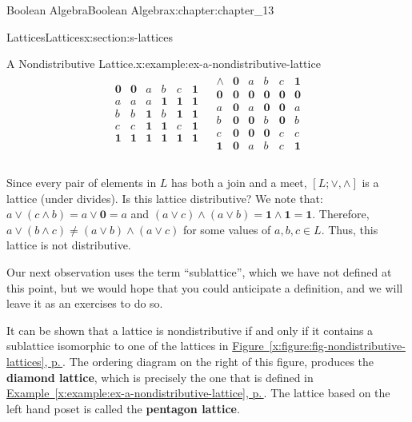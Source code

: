 \documentclass[twoside,10pt,]{book}
\newcommand{\xreffont}{\relax}
\newcommand{\terminology}[1]{\textbf{#1}}
\numberwithin{equation}{section}
\begin{document}
\begin{chapterptx}{Boolean Algebra}{}{Boolean Algebra}{}{}{x:chapter:chapter_13}
\begin{sectionptx}{Lattices}{}{Lattices}{}{}{x:section:s-lattices}
\begin{example}{A Nondistributive Lattice.}{x:example:ex-a-nondistributive-lattice}
\begin{equation*}
\begin{array}{cc}
\begin{array}{c|ccccc}
\hline
\pmb{0} &	 \pmb{0} & a & b & c & \pmb{1} \\
a & 	 a & a & \pmb{1} & \pmb{1} & \pmb{1} \\
b &	 b & \pmb{1} & b & \pmb{1} & \pmb{1} \\
c &	 c & \pmb{1} & \pmb{1} & c & \pmb{1} \\
\pmb{1} &	 \pmb{1} & \pmb{1} & \pmb{1} & \pmb{1} & \pmb{1} \\
\end{array}
&
\begin{array}{c|ccccc}
\land  & 	 \pmb{0} &  a  & b  &  c &  \pmb{1} \\
\hline
\pmb{0} &	 \pmb{0} & \pmb{0} & \pmb{0} & \pmb{0} & \pmb{0} \\
a & 	  \pmb{0} & a &  \pmb{0} &  \pmb{0} &  a \\
b & 	 \pmb{0} & \pmb{0} & b &  \pmb{0} &  b \\
c & 	 \pmb{0} &  \pmb{0} &  \pmb{0} & c &  c \\
\pmb{1} &  \pmb{0} &  a &  b &  c & \pmb{1} \\
\end{array}\\
\end{array}
\end{equation*}
%
\par
Since every pair of elements in \(L\) has both a join and a meet, \([L; \lor  , \land ]\) is a lattice (under divides). Is this lattice distributive? We note that: \(a \lor  (c \land  b) = a \lor  \pmb{0} = a\) and \((a \lor  c) \land  (a \lor  b) = \pmb{1} \land  \pmb{1} = \pmb{1}\). Therefore, \(a \lor  (b \land  c) \neq  (a \lor  b) \land  (a \lor  c)\) for some values of \(a, b, c \in  L\). Thus, this lattice is not  distributive.%
\end{example}
Our next observation uses the term ``sublattice'', which we have not defined at this point, but we would hope that you could anticipate a definition, and we will leave it as an exercises to do so.%
\par
It can be shown that a lattice is nondistributive if and only if it contains a sublattice isomorphic to one of the lattices in \hyperref[x:figure:fig-nondistributive-lattices]{Figure~{\xreffont\ref{x:figure:fig-nondistributive-lattices}}, p.\,\pageref{x:figure:fig-nondistributive-lattices}}.  The ordering diagram on the right of this figure, produces the \terminology{diamond lattice}, which is precisely the one that is defined in \hyperref[x:example:ex-a-nondistributive-lattice]{Example~{\xreffont\ref{x:example:ex-a-nondistributive-lattice}}, p.\,\pageref{x:example:ex-a-nondistributive-lattice}}.  The lattice based on the left hand poset is called the \terminology{pentagon lattice}.%

\end{sectionptx}
\end{chapterptx}
\end{document}
